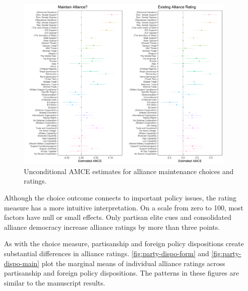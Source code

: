 \documentclass[12pt]{article}
\begin{document}
\begin{figure}
	\centering
		\includegraphics[width=0.95\textwidth]{maintenance-plots.png}
	\caption{Unconditional AMCE estimates for alliance maintenance choices and ratings.}
	\label{fig:maintenance-plots}
\end{figure}


Although the choice outcome connects to important policy issues, the rating measure has a more intuitive interpretation. 
On a scale from zero to 100, most factors have null or small effects. 
Only partisan elite cues and consolidated alliance democracy increase alliance ratings by more than three points. 


As with the choice measure, partisanship and foreign policy dispositions create substantial differences in alliance ratings.
\autoref{fig:party-dispo-form} and \autoref{fig:party-dispo-main} plot the marginal means of individual alliance ratings across partisanship and foreign policy dispositions. 
The patterns in these figures are similar to the manuscript results.  
\end{document}
